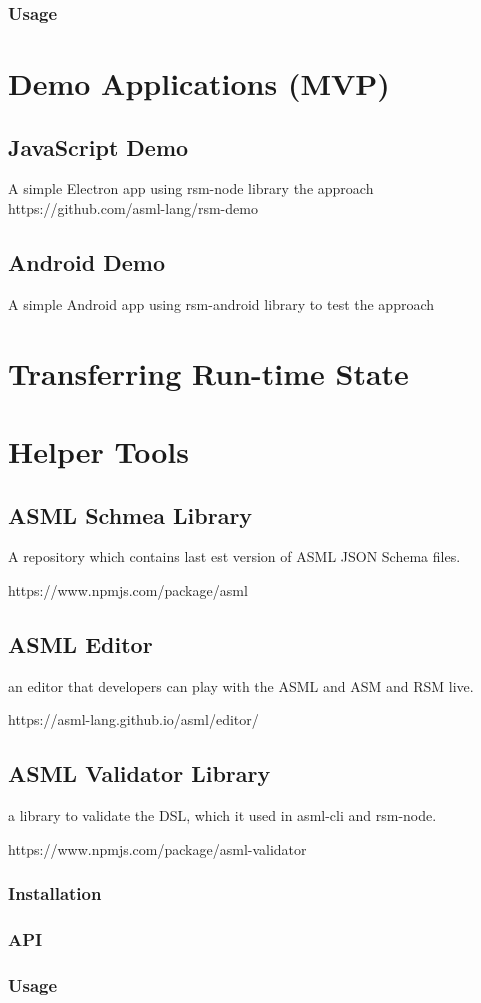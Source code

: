 \subsubsection{Usage}

\section{Demo Applications (MVP)}
\subsection{JavaScript Demo}
A simple Electron app using rsm-node library the approach
https://github.com/asml-lang/rsm-demo

\subsection{Android Demo}
A simple Android app using rsm-android library to test the approach

\section{Transferring Run-time State}


\section{Helper Tools}
\subsection{ASML Schmea Library}
A repository which contains last est version of ASML JSON Schema files.

https://www.npmjs.com/package/asml

\subsection{ASML Editor}
an editor that developers can play with the ASML and ASM and RSM live.

https://asml-lang.github.io/asml/editor/

\subsection{ASML Validator Library}
a library to validate the DSL, which it used in asml-cli and rsm-node.

https://www.npmjs.com/package/asml-validator

\subsubsection{Installation}
\subsubsection{API}
\subsubsection{Usage}